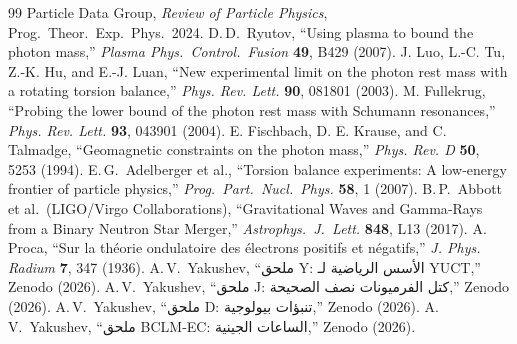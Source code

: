 \documentclass[12pt,a4paper]{article}
\begin{document}
	\begin{thebibliography}{99}
		 Particle Data Group, \emph{Review of Particle Physics}, Prog.\ Theor.\ Exp.\ Phys.\ 2024.
		 D.\,D.\ Ryutov, ``Using plasma to bound the photon mass,'' \emph{Plasma Phys.\ Control.\ Fusion} \textbf{49}, B429 (2007).
		 J. Luo, L.-C. Tu, Z.-K. Hu, and E.-J. Luan, ``New experimental limit on the photon rest mass with a rotating torsion balance,'' \emph{Phys. Rev. Lett.} \textbf{90}, 081801 (2003).
		 M. Fullekrug, ``Probing the lower bound of the photon rest mass with Schumann resonances,'' \emph{Phys. Rev. Lett.} \textbf{93}, 043901 (2004).
		 E. Fischbach, D. E. Krause, and C. Talmadge, ``Geomagnetic constraints on the photon mass,'' \emph{Phys. Rev. D} \textbf{50}, 5253 (1994).
		 E.\,G.\ Adelberger et al., ``Torsion balance experiments: A low‑energy frontier of particle physics,'' \emph{Prog.\ Part.\ Nucl.\ Phys.} \textbf{58}, 1 (2007).
		 B.\,P.\ Abbott et al.\ (LIGO/Virgo Collaborations), ``Gravitational Waves and Gamma‑Rays from a Binary Neutron Star Merger,'' \emph{Astrophys.\ J.\ Lett.} \textbf{848}, L13 (2017).
		 A. Proca, ``Sur la théorie ondulatoire des électrons positifs et négatifs,'' \emph{J. Phys. Radium} \textbf{7}, 347 (1936).
		 A.\,V.\ Yakushev, ``ملحق Y: الأسس الرياضية لـ YUCT,'' Zenodo (2026).
		 A.\,V.\ Yakushev, ``ملحق J: كتل الفرميونات نصف الصحيحة,'' Zenodo (2026).
		 A.\,V.\ Yakushev, ``ملحق D: تنبؤات بيولوجية,'' Zenodo (2026).
		 A.\,V.\ Yakushev, ``ملحق BCLM‑EC: الساعات الجينية,'' Zenodo (2026).
	\end{thebibliography}
	
\end{document}
